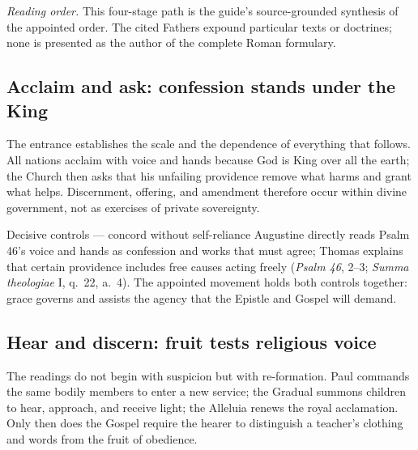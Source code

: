 \begin{deepstudy}
\noindent\emph{Reading order.} This four-stage path is the guide's source-grounded synthesis of the appointed order. The cited Fathers expound particular texts or doctrines; none is presented as the author of the complete Roman formulary.

\subsection*{Acclaim and ask: confession stands under the King\enspace{}}

The entrance establishes the scale and the dependence of everything that follows. All nations acclaim with voice and hands because God is King over all the earth; the Church then asks that his unfailing providence remove what harms and grant what helps. Discernment, offering, and amendment therefore occur within divine government, not as exercises of private sovereignty.

\begin{studybox}{Decisive controls --- concord without self-reliance}
Augustine directly reads Psalm 46's voice and hands as confession and works that must agree; Thomas explains that certain providence includes free causes acting freely (\emph{Psalm 46}, 2--3; \emph{Summa theologiae} I, q.~22, a.~4). The appointed movement holds both controls together: grace governs and assists the agency that the Epistle and Gospel will demand.
\end{studybox}

\subsection*{Hear and discern: fruit tests religious voice\enspace{}}

The readings do not begin with suspicion but with re-formation. Paul commands the same bodily members to enter a new service; the Gradual summons children to hear, approach, and receive light; the Alleluia renews the royal acclamation. Only then does the Gospel require the hearer to distinguish a teacher's clothing and words from the fruit of obedience.


\end{deepstudy}
